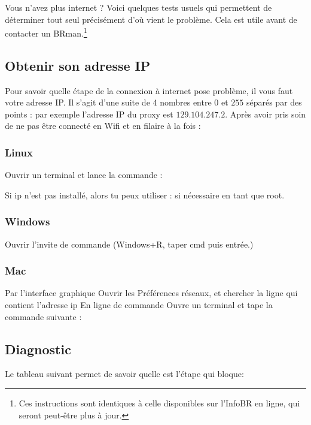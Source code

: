 \label{diagnostic}
Vous n'avez plus internet ? Voici quelques tests usuels qui permettent de déterminer tout seul précisément d'où vient le problème. Cela est utile avant de contacter un BRman.\footnote{Ces instructions sont identiques à celle disponibles sur l'InfoBR en ligne, qui seront peut-être plus à jour.}

\subsection{Obtenir son adresse IP}
Pour savoir quelle étape de la connexion à internet pose problème, il vous faut votre adresse IP. Il s'agit d'une suite de 4 nombres entre $0$ et $255$ séparés par des points : par exemple l'adresse IP du proxy est $129.104.247.2$. Après avoir pris soin de ne pas être connecté en Wifi et en filaire à la fois :

\subsubsection{Linux}
Ouvrir un terminal et lance la commande :

Si ip n'est pas installé, alors tu peux utiliser :
si nécessaire en tant que root.
 
\subsubsection{Windows}
Ouvrir l'invite de commande (Windows+R, taper cmd puis entrée.)
 
\subsubsection{Mac}
Par l'interface graphique
Ouvrir les Préférences réseaux, et chercher la ligne qui contient l'adresse ip
En ligne de commande
Ouvre un terminal et tape la commande suivante :

\subsection{Diagnostic}
Le tableau suivant permet de savoir quelle est l'étape qui bloque:

